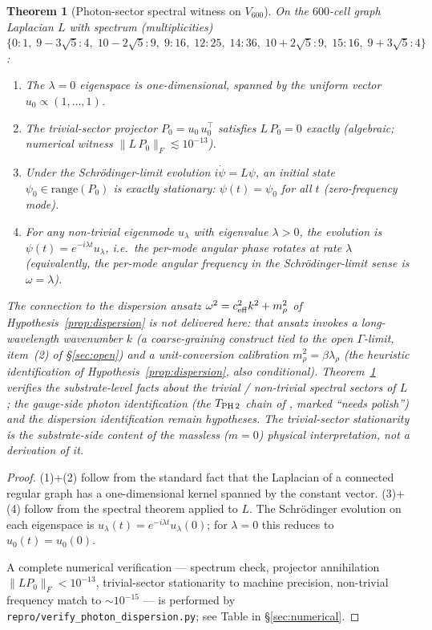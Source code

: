 \documentclass[11pt]{article}
\newtheorem{theorem}{Theorem}[section]
\theoremstyle{definition}
\begin{document}
\begin{theorem}[Photon-sector spectral witness on $V_{600}$]\label{thm:photon-sector}
On the $600$-cell graph Laplacian $L$ with spectrum (multiplicities)
$\{0:1,\;9-3\sqrt5:4,\;10-2\sqrt5:9,\;9:16,\;12:25,\;14:36,\;10+2\sqrt5:9,\;15:16,\;9+3\sqrt5:4\}$:
\begin{enumerate}
\item The $\lambda = 0$ eigenspace is one-dimensional, spanned by the uniform vector $u_0 \propto (1,\ldots,1)$.
\item The trivial-sector projector $P_0 = u_0\,u_0^{\!\top}$ satisfies $L\,P_0 = 0$ exactly (algebraic; numerical witness $\|L\,P_0\|_F \lesssim 10^{-13}$).
\item Under the Schr\"{o}dinger-limit evolution $i\dot\psi = L\psi$, an initial state $\psi_0 \in \mathrm{range}(P_0)$ is exactly stationary: $\psi(t) = \psi_0$ for all $t$ (zero-frequency mode).
\item For any non-trivial eigenmode $u_\lambda$ with eigenvalue $\lambda > 0$, the evolution is $\psi(t) = e^{-i\lambda t} u_\lambda$, i.e.\ the per-mode angular phase rotates at rate $\lambda$ (equivalently, the per-mode angular frequency in the Schr\"{o}dinger-limit sense is $\omega = \lambda$).
\end{enumerate}

\emph{The connection to the dispersion ansatz $\omega^2 = c_{\rm eff}^2 k^2 + m_\rho^2$ of Hypothesis~\ref{prop:dispersion} is not delivered here}: that ansatz invokes a long-wavelength wavenumber $k$ (a coarse-graining construct tied to the open $\Gamma$-limit, item~(2) of \S\ref{sec:open}) and a unit-conversion calibration $m_\rho^2 = \beta\lambda_\rho$ (the heuristic identification of Hypothesis~\ref{prop:dispersion}, also conditional). Theorem~\ref{thm:photon-sector} verifies the substrate-level facts about the trivial / non-trivial spectral sectors of $L$; the gauge-side photon identification (the $T_{\rm PH\,2}$ chain of \citep{CascadeAlphaChain}, marked ``needs polish'') and the dispersion identification remain hypotheses. The trivial-sector stationarity is the substrate-side content of the massless ($m = 0$) physical interpretation, not a derivation of it.
\end{theorem}

\begin{proof}[Proof]
(1)+(2) follow from the standard fact that the Laplacian of a connected regular graph has a one-dimensional kernel spanned by the constant vector. (3)+(4) follow from the spectral theorem applied to $L$. The Schr\"{o}dinger evolution on each eigenspace is $u_\lambda(t) = e^{-i\lambda t} u_\lambda(0)$; for $\lambda = 0$ this reduces to $u_0(t) = u_0(0)$.

A complete numerical verification --- spectrum check, projector annihilation $\|L P_0\|_F < 10^{-13}$, trivial-sector stationarity to machine precision, non-trivial frequency match to $\sim 10^{-15}$ --- is performed by \texttt{repro/verify\_photon\_dispersion.py}; see Table in \S\ref{sec:numerical}.
\end{proof}
\end{document}
